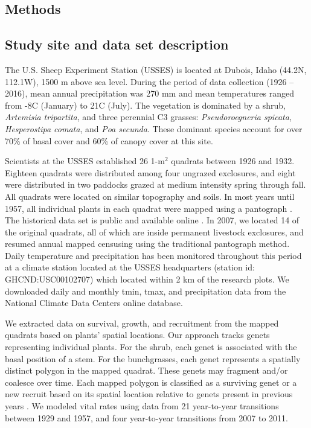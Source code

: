 \documentclass[11pt]{article}
\begin{document}
\begin{doublespacing}
\section*{Methods}

\subsection*{Study site and data set description}

The U.S. Sheep Experiment Station (USSES) is located at Dubois, Idaho (44.2\degree N, 112.1\degree W), 1500 m above sea level. During the period of data collection (1926 – 2016), mean annual precipitation was 270 mm and mean temperatures ranged from -8\degree C (January) to 21\degree C (July). The vegetation is dominated by a shrub, \textit{Artemisia tripartita}, and three perennial C3 grasses: \textit{Pseudoroegneria spicata}, \textit{Hesperostipa comata}, and \textit{Poa secunda}. These dominant species account for over 70\% of basal cover and 60\% of canopy cover at this site. 

Scientists at the USSES established 26 1-m$^2$ quadrats between 1926 and 1932. Eighteen quadrats were distributed among four ungrazed exclosures, and eight were distributed in two paddocks grazed at medium intensity spring through fall. All quadrats were located on similar topography and soils. In most years until 1957, all individual plants in each quadrat were mapped using a pantograph \citep{blaisdell_}. The historical data set is public and available online \citep{zachmann_mapped_2010}. In 2007, we located 14 of the original quadrats, all of which are inside permanent livestock exclosures, and resumed annual mapped censusing using the traditional pantograph method. Daily temperature and precipitation has been monitored throughout this period at a climate station located at the USSES headquarters (station id: GHCND:USC00102707) which located within 2 km of the research plots.  We downloaded daily and monthly tmin, tmax, and precipitation data from the National Climate Data Centers online database.  

We extracted data on survival, growth, and recruitment from the mapped quadrats based on plants' spatial locations. Our approach tracks genets representing individual plants.  For the shrub, each genet is associated with the basal position of a stem.  For the bunchgrasses, each genet represents a spatially distinct polygon in the mapped quadrat. These genets may fragment and/or coalesce over time. Each mapped polygon is classified as a surviving genet or a new recruit based on its spatial location relative to genets present in previous years \citep{lauenroth_demography_2008}. We modeled vital rates using data from 21 year-to-year transitions between 1929 and 1957, and four year-to-year transitions from 2007 to 2011.  


\end{doublespacing}
\end{document}
